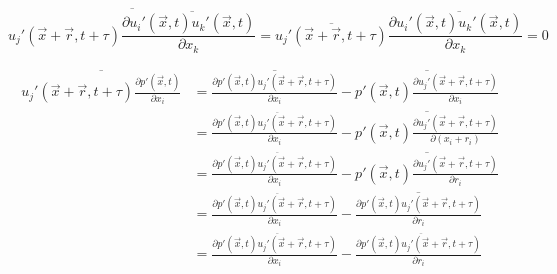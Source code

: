 \documentclass[paper=a4, fontsize=11pt]{scrartcl} %
\numberwithin{equation}{section} %
\numberwithin{figure}{section} %
\numberwithin{table}{section} %
\begin{document}
	\begin{equation}
		\overline{u_j'(\vec{x} + \vec{r}, t+\tau) \frac{\partial \overline{u_i'(\vec{x}, t)u_k'(\vec{x}, t)}}{\partial x_k}} = \overline{u_j'(\vec{x} + \vec{r}, t+\tau)} \frac{\partial \overline{u_i'(\vec{x}, t)u_k'(\vec{x}, t)}}{\partial x_k} = 0
	\end{equation}
	
	\begin{equation}
		\begin{aligned}
			\overline{u_j'(\vec{x} + \vec{r}, t+\tau) \frac{\partial p'(\vec{x}, t)}{\partial x_i}} 
			& = \overline{\frac{\partial p'(\vec{x}, t) u_j'(\vec{x} + \vec{r}, t+\tau)}{\partial x_i}} - \overline{p'(\vec{x}, t) \frac{\partial u_j'(\vec{x} + \vec{r}, t+\tau)}{\partial x_i}}\\
			& = \frac{\partial \overline{p'(\vec{x}, t) u_j'(\vec{x} + \vec{r}, t+\tau)}}{\partial x_i} - \overline{p'(\vec{x}, t) \frac{\partial u_j'(\vec{x} + \vec{r}, t+\tau)}{\partial (x_i + r_i)}}\\
			& = \frac{\partial \overline{p'(\vec{x}, t) u_j'(\vec{x} + \vec{r}, t+\tau)}}{\partial x_i} - \overline{p'(\vec{x}, t) \frac{\partial u_j'(\vec{x} + \vec{r}, t+\tau)}{\partial r_i}}\\
			& = \frac{\partial \overline{p'(\vec{x}, t) u_j'(\vec{x} + \vec{r}, t+\tau)}}{\partial x_i} - \overline{\frac{\partial p'(\vec{x}, t) u_j'(\vec{x} + \vec{r}, t+\tau)}{\partial r_i}}\\
			& = \frac{\partial \overline{p'(\vec{x}, t) u_j'(\vec{x} + \vec{r}, t+\tau)}}{\partial x_i} - \frac{\partial \overline{p'(\vec{x}, t) u_j'(\vec{x} + \vec{r}, t+\tau)}}{\partial r_i}
		\end{aligned}
	\end{equation}
	
\end{document}
